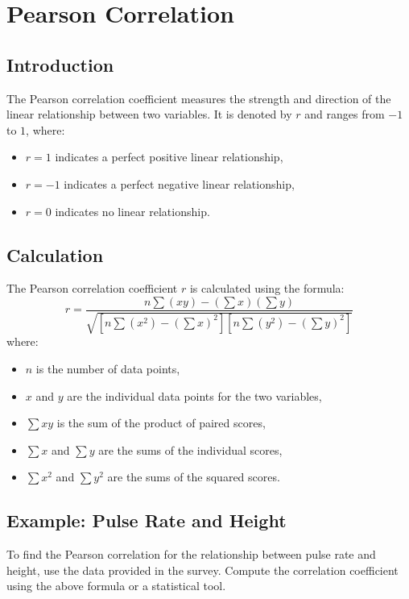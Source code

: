 \documentclass{article}
\begin{document}
\section{Pearson Correlation}

\subsection{Introduction}
The Pearson correlation coefficient measures the strength and direction of the linear relationship between two variables. It is denoted by \( r \) and ranges from \(-1\) to \(1\), where:
\begin{itemize}
    \item \( r = 1 \) indicates a perfect positive linear relationship,
    \item \( r = -1 \) indicates a perfect negative linear relationship,
    \item \( r = 0 \) indicates no linear relationship.
\end{itemize}

\subsection{Calculation}
The Pearson correlation coefficient \( r \) is calculated using the formula:
\begin{equation}
    r = \frac{n \sum (xy) - (\sum x)(\sum y)}{\sqrt{[n \sum (x^2) - (\sum x)^2][n \sum (y^2) - (\sum y)^2]}}
\end{equation}
where:
\begin{itemize}
    \item \( n \) is the number of data points,
    \item \( x \) and \( y \) are the individual data points for the two variables,
    \item \( \sum xy \) is the sum of the product of paired scores,
    \item \( \sum x \) and \( \sum y \) are the sums of the individual scores,
    \item \( \sum x^2 \) and \( \sum y^2 \) are the sums of the squared scores.
\end{itemize}

\subsection{Example: Pulse Rate and Height}
To find the Pearson correlation for the relationship between pulse rate and height, use the data provided in the survey. Compute the correlation coefficient using the above formula or a statistical tool.
\end{document}
